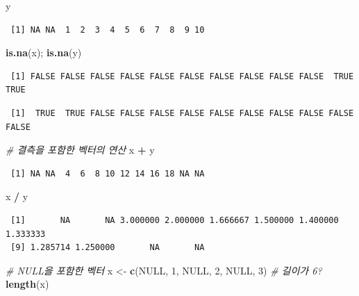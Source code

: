 \documentclass[
  11pt,
]{krantz}
\newenvironment{Shaded}{\begin{snugshade}}{\end{snugshade}}
\newcommand{\CommentTok}[1]{\textcolor[rgb]{0.37,0.37,0.37}{\textit{#1}}}
\newcommand{\DecValTok}[1]{\textcolor[rgb]{0.06,0.06,0.06}{#1}}
\newcommand{\KeywordTok}[1]{\textcolor[rgb]{0.27,0.27,0.27}{\textbf{#1}}}
\newcommand{\NormalTok}[1]{#1}
\newcommand{\OperatorTok}[1]{\textcolor[rgb]{0.43,0.43,0.43}{\textbf{#1}}}
\newcommand{\OtherTok}[1]{\textcolor[rgb]{0.37,0.37,0.37}{#1}}
\newcommand{\StringTok}[1]{\textcolor[rgb]{0.5,0.5,0.5}{#1}}
\begin{document}
\begin{Shaded}
\begin{Highlighting}[]
\NormalTok{y}
\end{Highlighting}
\end{Shaded}

\begin{verbatim}
 [1] NA NA  1  2  3  4  5  6  7  8  9 10
\end{verbatim}

\begin{Shaded}
\begin{Highlighting}[]
\KeywordTok{is.na}\NormalTok{(x); }\KeywordTok{is.na}\NormalTok{(y)}
\end{Highlighting}
\end{Shaded}

\begin{verbatim}
 [1] FALSE FALSE FALSE FALSE FALSE FALSE FALSE FALSE FALSE FALSE  TRUE  TRUE
\end{verbatim}

\begin{verbatim}
 [1]  TRUE  TRUE FALSE FALSE FALSE FALSE FALSE FALSE FALSE FALSE FALSE FALSE
\end{verbatim}

\begin{Shaded}
\begin{Highlighting}[]
\CommentTok{# 결측을 포함한 벡터의 연산 }
\NormalTok{x }\OperatorTok{+}\StringTok{ }\NormalTok{y}
\end{Highlighting}
\end{Shaded}

\begin{verbatim}
 [1] NA NA  4  6  8 10 12 14 16 18 NA NA
\end{verbatim}

\begin{Shaded}
\begin{Highlighting}[]
\NormalTok{x }\OperatorTok{/}\StringTok{ }\NormalTok{y}
\end{Highlighting}
\end{Shaded}

\begin{verbatim}
 [1]       NA       NA 3.000000 2.000000 1.666667 1.500000 1.400000 1.333333
 [9] 1.285714 1.250000       NA       NA
\end{verbatim}

\begin{Shaded}
\begin{Highlighting}[]
\CommentTok{# NULL을 포함한 벡터 }
\NormalTok{x <-}\StringTok{ }\KeywordTok{c}\NormalTok{(}\OtherTok{NULL}\NormalTok{, }\DecValTok{1}\NormalTok{, }\OtherTok{NULL}\NormalTok{, }\DecValTok{2}\NormalTok{, }\OtherTok{NULL}\NormalTok{, }\DecValTok{3}\NormalTok{) }\CommentTok{# 길이가 6?}
\KeywordTok{length}\NormalTok{(x)}
\end{Highlighting}
\end{Shaded}
\end{document}
